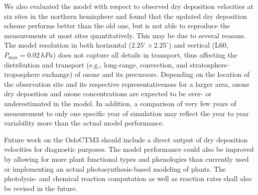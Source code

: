 \documentclass[gmd, manuscript]{copernicus}
\begin{document}
We also evaluated the model with respect to observed dry deposition velocities at six sites in the northern hemisphere and found that the updated dry deposition scheme performs better than the old one, but is not able to reproduce the measurements at most sites quantitatively. This may be due to several reasons. The model resolution in both horizontal ($2.25^\circ\times 2.25^\circ$) and vertical (L60, $P_\text{max}=0.02\,\unit{hPa}$) does not capture all details in transport, thus affecting the distribution and transport (e.g., long-range, convection, and stratosphere--troposphere exchange) of ozone and its precursors. Depending on the location of the observation site and its respective representativeness for a larger area, ozone dry deposition and ozone concentrations are expected to be over- or underestimated in the model. In addition, a comparison of very few years of measurement to only one specific year of simulation may reflect the year to year variability more than the actual model performance.

Future work on the OsloCTM3 should include a direct output of dry deposition velocities for diagnostic purposes. The model performance could also be improved by allowing for more plant functional types and phenologies than currently used or implementing an actual photosynthesis-based modeling of plants. The photolysis- and chemical reaction computation as well as reaction rates shall also be revised in the future.










\clearpage
\end{document}
